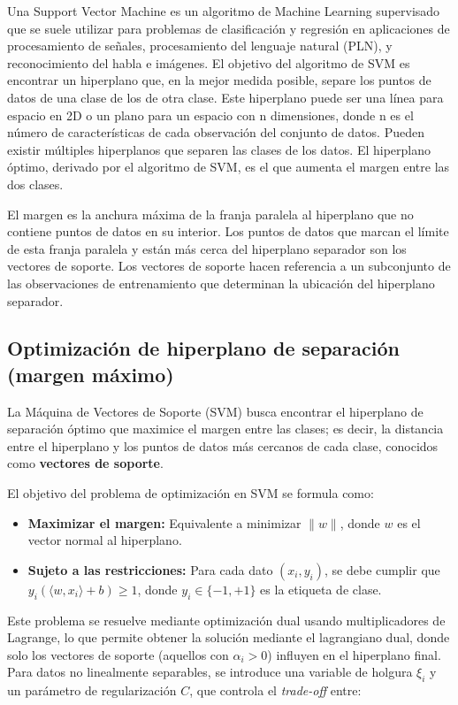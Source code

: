Una Support Vector Machine es un algoritmo de Machine Learning supervisado que se suele utilizar para problemas de clasificación y regresión en aplicaciones de procesamiento de señales, procesamiento del lenguaje natural (PLN), y reconocimiento del habla e imágenes. El objetivo del algoritmo de SVM es encontrar un hiperplano que, en la mejor medida posible, separe los puntos de datos de una clase de los de otra clase. Este hiperplano puede ser una línea para espacio en 2D o un plano para un espacio con n dimensiones, donde n es el número de características de cada observación del conjunto de datos. Pueden existir múltiples hiperplanos que separen las clases de los datos. El hiperplano óptimo, derivado por el algoritmo de SVM, es el que aumenta el margen entre las dos clases.

El margen es la anchura máxima de la franja paralela al hiperplano que no contiene puntos de datos en su interior. Los puntos de datos que marcan el límite de esta franja paralela y están más cerca del hiperplano separador son los vectores de soporte. Los vectores de soporte hacen referencia a un subconjunto de las observaciones de entrenamiento que determinan la ubicación del hiperplano separador.

\subsection{Optimización de hiperplano de separación (margen máximo)}

La Máquina de Vectores de Soporte (SVM) busca encontrar el hiperplano de separación óptimo que maximice el margen entre las clases; es decir, la distancia entre el hiperplano y los puntos de datos más cercanos de cada clase, conocidos como \textbf{vectores de soporte}.

El objetivo del problema de optimización en SVM se formula como:

\begin{itemize}
    \item \textbf{Maximizar el margen:} Equivalente a minimizar $\|w\|$, donde $w$ es el vector normal al hiperplano.
    \item \textbf{Sujeto a las restricciones:} Para cada dato $(x_i, y_i)$, se debe cumplir que $y_i(\langle w, x_i \rangle + b) \geq 1$, donde $y_i \in \{-1, +1\}$ es la etiqueta de clase.
\end{itemize}

Este problema se resuelve mediante optimización dual usando multiplicadores de Lagrange, lo que permite obtener la solución mediante el lagrangiano dual, donde solo los vectores de soporte (aquellos con $\alpha_i > 0$) influyen en el hiperplano final. Para datos no linealmente separables, se introduce una variable de holgura $\xi_i$ y un parámetro de regularización $C$, que controla el \textit{trade-off} entre:

